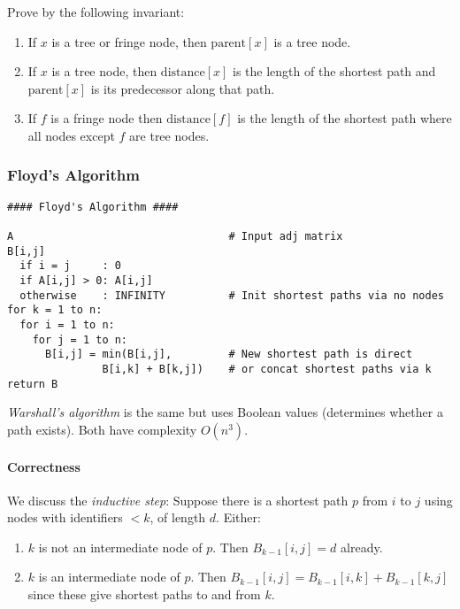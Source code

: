 \documentclass[twocolumn,english]{article}
\begin{document}
Prove by the following invariant:
\begin{enumerate}
\item If $x$ is a tree or fringe node, then $\mbox{parent}\left[x\right]$
is a tree node.
\item If $x$ is a tree node, then $\mbox{distance}\left[x\right]$ is the
length of the shortest path and $\mbox{parent}\left[x\right]$ is
its predecessor along that path.
\item If $f$ is a fringe node then $\mbox{distance}\left[f\right]$ is
the length of the shortest path where all nodes except $f$ are tree
nodes.
\end{enumerate}

\subsubsection{Floyd's Algorithm}

\begin{lstlisting}[basicstyle={\footnotesize\ttfamily},showstringspaces=false]
#### Floyd's Algorithm ####

A                                  # Input adj matrix
B[i,j]
  if i = j     : 0
  if A[i,j] > 0: A[i,j]
  otherwise    : INFINITY          # Init shortest paths via no nodes
for k = 1 to n:
  for i = 1 to n:
    for j = 1 to n:
      B[i,j] = min(B[i,j],         # New shortest path is direct
               B[i,k] + B[k,j])    # or concat shortest paths via k
return B
\end{lstlisting}


\emph{Warshall's algorithm} is the same but uses Boolean values (determines
whether a path exists). Both have complexity $O\left(n^{3}\right)$.


\paragraph{Correctness}

We discuss the \emph{inductive step}: Suppose there is a shortest
path $p$ from $i$ to $j$ using nodes with identifiers $<k$, of
length $d$. Either:
\begin{enumerate}
\item $k$ is not an intermediate node of $p$. Then $B_{k-1}\left[i,j\right]=d$
already.
\item $k$ is an intermediate node of $p$. Then $B_{k-1}\left[i,j\right]=B_{k-1}\left[i,k\right]+B_{k-1}\left[k,j\right]$
since these give shortest paths to and from $k$.
\end{enumerate}
\end{document}
